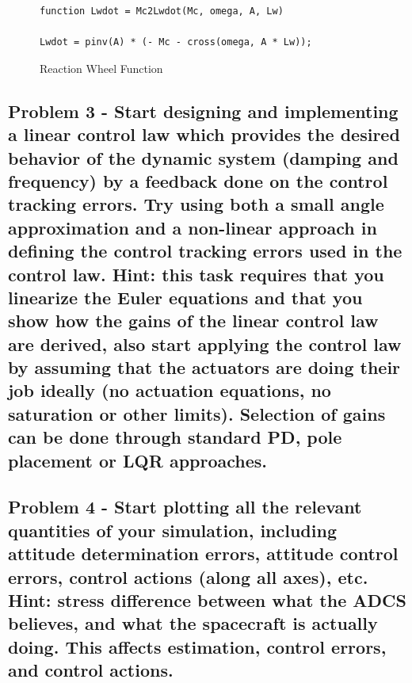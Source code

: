 \begin{figure}[H]
    \centering
    \captionsetup{ justification = centering}
    \begin{lstlisting}
function Lwdot = Mc2Lwdot(Mc, omega, A, Lw)

Lwdot = pinv(A) * (- Mc - cross(omega, A * Lw));
    \end{lstlisting}
    \caption{Reaction Wheel Function}
    \label{fig:rwCode}
\end{figure}


\subsection{Problem 3 - Start designing and implementing a linear control law which provides the desired behavior of the dynamic system (damping and frequency) by a feedback done on the control tracking errors. Try using both a small angle approximation and a non-linear approach in defining the control tracking errors used in the control law. Hint: this task requires that you linearize the Euler equations and that you show how the gains of the linear control law are derived, also start applying the control law by assuming that the actuators are doing their job ideally (no actuation equations, no saturation or other limits). Selection of gains can be done through standard PD, pole placement or LQR approaches.}

\subsection{Problem 4 - Start plotting all the relevant quantities of your simulation, including attitude determination errors, attitude control errors, control actions (along all axes), etc. Hint: stress difference between what the ADCS believes, and what the spacecraft is actually doing. This affects estimation, control errors, and control actions.}